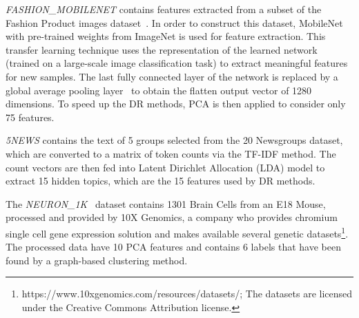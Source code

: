 \emph{FASHION\_MOBILENET} contains features extracted from a subset of the Fashion Product images dataset~\cite{fashionproduct}.
In order to construct this dataset, MobileNet~\cite{} with pre-trained weights from ImageNet is used for feature extraction. This transfer learning technique uses the representation of the learned network (trained on a large-scale image classification task) to extract meaningful features for new samples.
The last fully connected layer of the network is replaced by a global average pooling layer~\cite{} to obtain the flatten output vector of 1280 dimensions.
To speed up the DR methods, PCA is then applied to consider only 75 features.

\emph{5NEWS} contains the text of 5 groups selected from the 20 Newsgroups dataset, which are converted to a matrix of token counts via the TF-IDF method.
The count vectors are then fed into Latent Dirichlet Allocation (LDA) model to extract 15 hidden topics, which are the 15 features used by DR methods.

The \emph{NEURON\_1K}~\cite{neuron1k} dataset contains 1301 Brain Cells from an E18 Mouse, processed and provided by 10X Genomics, a company who provides chromium single cell gene expression solution and makes available several genetic datasets\footnote{https://www.10xgenomics.com/resources/datasets/; The datasets are licensed under the Creative Commons Attribution license.}.
The processed data have 10 PCA features and contains 6 labels that have been found by a graph-based clustering method.

